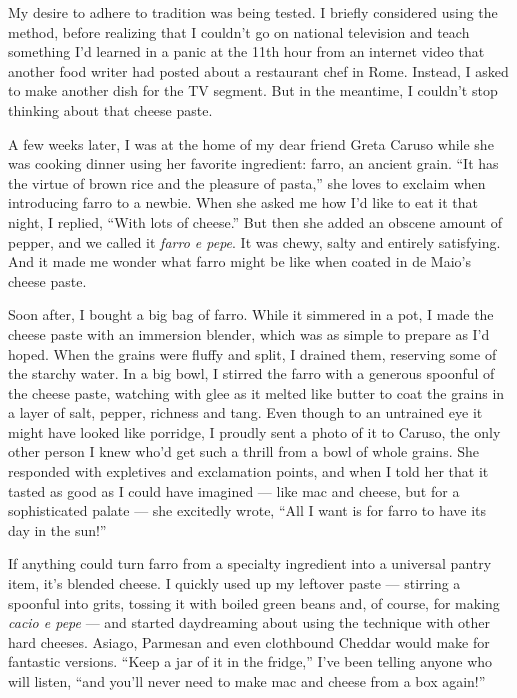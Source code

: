 My desire to adhere to tradition was being tested. I briefly considered
using the method, before realizing that I couldn't go on national
television and teach something I'd learned in a panic at the 11th hour
from an internet video that another food writer had posted about a
restaurant chef in Rome. Instead, I asked to make another dish for the
TV segment. But in the meantime, I couldn't stop thinking about that
cheese paste.

A few weeks later, I was at the home of my dear friend Greta Caruso
while she was cooking dinner using her favorite ingredient: farro, an
ancient grain. ``It has the virtue of brown rice and the pleasure of
pasta,'' she loves to exclaim when introducing farro to a newbie. When
she asked me how I'd like to eat it that night, I replied, ``With lots
of cheese.'' But then she added an obscene amount of pepper, and we
called it \emph{farro e pepe}. It was chewy, salty and entirely
satisfying. And it made me wonder what farro might be like when coated
in de Maio's cheese paste.

Soon after, I bought a big bag of farro. While it simmered in a pot, I
made the cheese paste with an immersion blender, which was as simple to
prepare as I'd hoped. When the grains were fluffy and split, I drained
them, reserving some of the starchy water. In a big bowl, I stirred the
farro with a generous spoonful of the cheese paste, watching with glee
as it melted like butter to coat the grains in a layer of salt, pepper,
richness and tang. Even though to an untrained eye it might have looked
like porridge, I proudly sent a photo of it to Caruso, the only other
person I knew who'd get such a thrill from a bowl of whole grains. She
responded with expletives and exclamation points, and when I told her
that it tasted as good as I could have imagined --- like mac and cheese,
but for a sophisticated palate --- she excitedly wrote, ``All I want is
for farro to have its day in the sun!''

If anything could turn farro from a specialty ingredient into a
universal pantry item, it's blended cheese. I quickly used up my
leftover paste --- stirring a spoonful into grits, tossing it with
boiled green beans and, of course, for making \emph{cacio e pepe} ---
and started daydreaming about using the technique with other hard
cheeses. Asiago, Parmesan and even clothbound Cheddar would make for
fantastic versions. ``Keep a jar of it in the fridge,'' I've been
telling anyone who will listen, ``and you'll never need to make mac and
cheese from a box again!''

